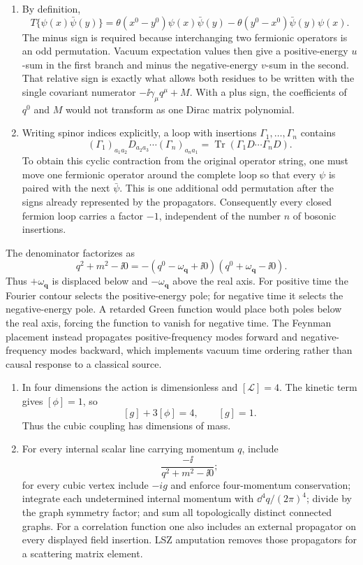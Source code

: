 \begin{enumerate}
\begin{enumerate}
opposite pole orientations then reproduce the two terms in the
time-ordered mode expansion.  This check fixes both the numerator and
the \(i0\) assignment.
\item
By definition,
\[
 T\{\psi(x)\bar\psi(y)\}
 =\theta(x^0-y^0)\psi(x)\bar\psi(y)
 -\theta(y^0-x^0)\bar\psi(y)\psi(x).
\]
The minus sign is required because interchanging two fermionic
operators is an odd permutation.  Vacuum expectation values then give a
positive-energy \(u\)-sum in the first branch and minus the
negative-energy \(v\)-sum in the second.  That relative sign is exactly
what allows both residues to be written with the single covariant
numerator \(-\ii\gamma_\mu q^\mu+M\).  With a plus sign, the coefficients
of \(q^0\) and \(M\) would not transform as one Dirac matrix polynomial.
\item
Writing spinor indices explicitly, a loop with insertions
\(\Gamma_1,\ldots,\Gamma_n\) contains
\[
 (\Gamma_1)_{a_1a_2}D_{a_2a_3}\cdots
 (\Gamma_n)_{a_na_1}
 =\operatorname{Tr}(\Gamma_1D\cdots\Gamma_nD).
\]
To obtain this cyclic contraction from the original operator string, one
must move one fermionic operator around the complete loop so that every
\(\psi\) is paired with the next \(\bar\psi\).  This is one additional
odd permutation after the signs already represented by the propagators.
Consequently every closed fermion loop carries a factor \(-1\), independent
of the number \(n\) of bosonic insertions.
\end{enumerate}

The denominator factorizes as
\[
 q^2+m^2-\ii0
 =-(q^0-\omega_{\mathbf q}+\ii0)(q^0+\omega_{\mathbf q}-\ii0).
\]
Thus \(+\omega_{\mathbf q}\) is displaced below and
\(-\omega_{\mathbf q}\) above the real axis.  For positive time the Fourier
contour selects the positive-energy pole; for negative time it selects
the negative-energy pole.  A retarded Green function would place both
poles below the real axis, forcing the function to vanish for negative
time.  The Feynman placement instead propagates positive-frequency modes
forward and negative-frequency modes backward, which implements vacuum
time ordering rather than causal response to a classical source.

\begin{enumerate}
\item
In four dimensions the action is dimensionless and
\([\mathcal L]=4\).  The kinetic term gives \([\phi]=1\), so
\[
 [g]+3[\phi]=4,
 \qquad [g]=1.
\]
Thus the cubic coupling has dimensions of mass.
\item
For every internal scalar line carrying momentum \(q\), include
\[
 \frac{-\ii}{q^2+m^2-\ii0};
\]
for every cubic vertex include \(-ig\) and enforce four-momentum
conservation; integrate each undetermined internal momentum with
\(\dd^4q/(2\pi)^4\); divide by the graph symmetry factor; and sum all
topologically distinct connected graphs.  For a correlation function one
also includes an external propagator on every displayed field insertion.
LSZ amputation removes those propagators for a scattering matrix element.


\end{enumerate}
\end{enumerate}
